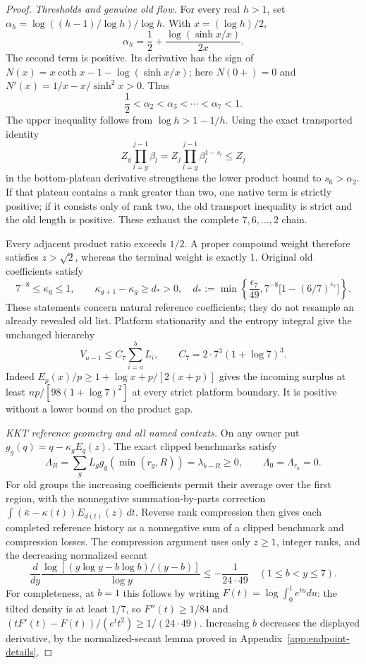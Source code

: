 \begin{proof}
\emph{Thresholds and genuine old flow.}
For every real $h>1$, set
$\alpha_h=\log((h-1)/\log h)/\log h$. With $x=(\log h)/2$,
\[
 \alpha_h=\frac12+\frac{\log(\sinh x/x)}{2x}.
\]
The second term is positive. Its derivative has the sign of
$N(x)=x\coth x-1-\log(\sinh x/x)$; here
$N(0+)=0$ and $N'(x)=1/x-x/\sinh^2x>0$.
Thus
\begin{equation}
 \frac12<\alpha_2<\alpha_3<\cdots<\alpha_7<1.
 \label{k6geom:alpha}
\end{equation}
The upper inequality follows from $\log h>1-1/h$.
Using the exact transported identity
\[
 Z_g\prod_{l=g}^{j-1}\beta_l
       =Z_j\prod_{l=g}^{j-1}\beta_l^{1-s_l}\leq Z_j
\]
in the bottom-plateau derivative strengthens the lower product bound
to $s_6>\alpha_2$. If that plateau contains a rank greater than two,
one native term is strictly positive; if it consists only of rank
two, the old transport inequality is strict and the old length is
positive. These exhaust the complete $7,6,\ldots,2$ chain.

Every adjacent product ratio exceeds $1/2$. A proper compound weight
therefore satisfies $z>\sqrt2$, whereas the terminal weight is exactly
$1$. Original old coefficients satisfy
\[
 7^{-8}\leq\kappa_g\leq1,\qquad
 \kappa_{g+1}-\kappa_g\geq d_*>0,
\quad
 d_*:=\min\left\{\frac{\epsilon_7}{49},
 7^{-8}\bigl[1-(6/7)^{\epsilon_7}\bigr]\right\}.
\]
These statements concern natural reference coefficients; they do not
resample an already revealed old list. Platform stationarity and the
entropy integral give the unchanged hierarchy
\[
 V_{a-1}\leq C_7\sum_{i=a}^bL_i,
 \qquad C_7=2\cdot7^3(1+\log7)^3.
\]
Indeed $E_p(x)/p\geq1+\log x+p/[2(x+p)]$ gives the incoming
surplus at least $np/[98(1+\log7)^2]$ at every strict platform
boundary. It is positive without a lower bound on the product gap.

\emph{KKT reference geometry and all named contexts.}
On any owner put $g_g(q)=q-\kappa_gE_q(z)$. The exact clipped
benchmarks satisfy
\[
 \Lambda_R=\sum_gL_gg_g(\min(r_g,R))
            =\lambda_{b-R}\geq0,
 \qquad \Lambda_0=\Lambda_{r_a}=0.
\]
For old groups the increasing coefficients permit their average
over the first region, with the nonnegative summation-by-parts
correction
$\int(\bar\kappa-\kappa(t))E_{d(t)}(z)\,dt$.
Reverse rank compression then gives each completed reference history
as a nonnegative sum of a clipped benchmark and compression losses.
The compression argument uses only $z\geq1$, integer ranks, and
the decreasing normalized secant
\[
 \frac{d}{dy}\frac{\log[(y\log y-b\log b)/(y-b)]}{\log y}
       \leq-\frac1{24\cdot49}\quad(1\leq b<y\leq7).
\]
For completeness, at $b=1$ this follows by writing
$F(t)=\log\int_0^1e^{tu}du$: the tilted density is at least $1/7$,
so $F''(t)\geq1/84$ and
$(tF'(t)-F(t))/(e^tt^2)\geq1/(24\cdot49)$.
Increasing $b$ decreases the displayed derivative, by the normalized-secant
lemma proved in Appendix~\ref{app:endpoint-details}.


\end{proof}
